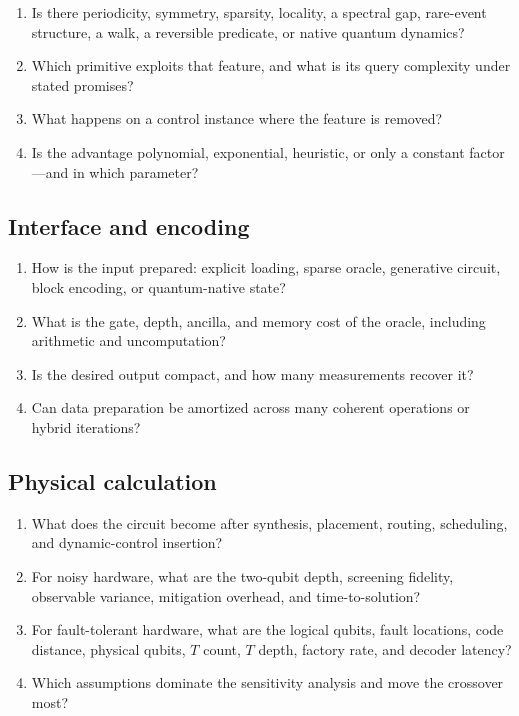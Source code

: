 \begin{enumerate}[resume]
  \item Is there periodicity, symmetry, sparsity, locality, a spectral gap, rare-event structure, a walk, a reversible predicate, or native quantum dynamics?
  \item Which primitive exploits that feature, and what is its query complexity under stated promises?
  \item What happens on a control instance where the feature is removed?
  \item Is the advantage polynomial, exponential, heuristic, or only a constant factor---and in which parameter?
\end{enumerate}

\subsection{Interface and encoding}

\begin{enumerate}[resume]
  \item How is the input prepared: explicit loading, sparse oracle, generative circuit, block encoding, or quantum-native state?
  \item What is the gate, depth, ancilla, and memory cost of the oracle, including arithmetic and uncomputation?
  \item Is the desired output compact, and how many measurements recover it?
  \item Can data preparation be amortized across many coherent operations or hybrid iterations?
\end{enumerate}

\subsection{Physical calculation}

\begin{enumerate}[resume]
  \item What does the circuit become after synthesis, placement, routing, scheduling, and dynamic-control insertion?
  \item For noisy hardware, what are the two-qubit depth, screening fidelity, observable variance, mitigation overhead, and time-to-solution?
  \item For fault-tolerant hardware, what are the logical qubits, fault locations, code distance, physical qubits, $T$ count, $T$ depth, factory rate, and decoder latency?
  \item Which assumptions dominate the sensitivity analysis and move the crossover most?
\end{enumerate}

